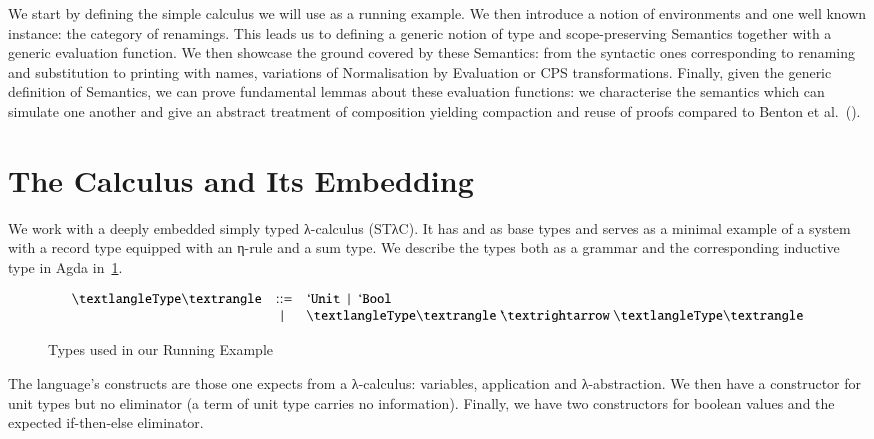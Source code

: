 We start by defining the simple calculus we will
use as a running example. We then introduce a notion of environments
and one well known instance: the category of renamings. This leads us
to defining a generic notion of type and scope-preserving Semantics
together with a generic evaluation function. We then showcase the
ground covered by these Semantics: from the syntactic ones
corresponding to renaming and substitution to printing with names,
variations of Normalisation by Evaluation or CPS transformations.
Finally, given the generic
definition of Semantics, we can prove fundamental lemmas about these
evaluation functions: we characterise the semantics which can simulate
one another and give an abstract treatment of composition yielding
compaction and reuse of proofs compared to Benton et
al.~(\citeyear{benton2012strongly}).

\section{The Calculus and Its Embedding}
\label{sec:stlccalculus}
We work with a deeply embedded simply typed λ-calculus (STλC). It has \unit{} and \bool{}
as base types and serves as a minimal example of a system with a record type equipped
with an η-rule and a sum type. We describe the types both as a grammar and the
corresponding inductive type in Agda in~\cref{fig:type}.

\begin{figure}[h]
\begin{minipage}{0.5\textwidth}
\[
\begin{array}{lcl}
\nonterminal{\type{}}
  & ::=    & \unit{}
  ~ \mid{} ~ \bool{} \\
  & \mid{} & \arrow{\nonterminal{\type{}}}{\nonterminal{\type{}}}
\end{array}
\]
\end{minipage}
\begin{minipage}{0.5\textwidth}
\end{minipage}
\caption{Types used in our Running Example\label{fig:type}}
\end{figure}

The language's constructs are those one expects from a λ-calculus: variables,
application and λ-abstraction. We then have a constructor for unit types but
no eliminator (a term of unit type carries no information). Finally, we have
two constructors for boolean values and the expected if-then-else eliminator.

